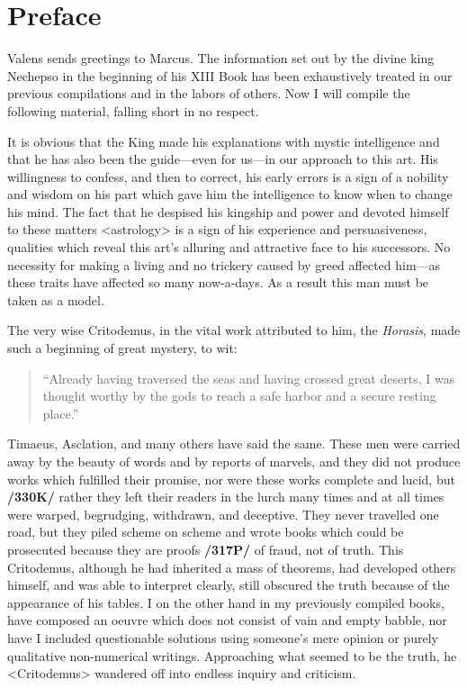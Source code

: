 \section{Preface}

 
Valens sends greetings to Marcus. The information set out by the divine king Nechepso in the beginning of his XIII Book has been exhaustively treated in our previous compilations and in the labors of others. Now I will compile the following material, falling short in no respect. 

It is obvious that the King made his explanations with mystic intelligence and that he has also been the guide—even for us—in our
approach to this art. His willingness to confess, and then to correct, his early errors is a sign of a nobility and wisdom on his part which gave him the intelligence to know when to change his mind. The fact that
he despised his kingship and power and devoted himself to these matters <astrology> is a sign of his experience and persuasiveness, qualities which reveal this art’s alluring and attractive face to his successors. No necessity for making a living and no trickery caused by greed affected him—as these traits have affected so many now-a-days. As a result this man must be taken as a model.

The very wise Critodemus, in the vital work attributed to him, the \textit{Horasis}, made such a beginning of great mystery, to wit: 
\begin{quote}
“Already having traversed the seas and having crossed great deserts, I was thought worthy by the gods to reach a safe harbor and a secure resting place.”
\end{quote}

 
Timaeus, Asclation, and many others have said the same. These men were carried away by the beauty of words and by reports of marvels, and they did not produce works which fulfilled their promise, nor were these works complete and lucid, but \textbf{/330K/} rather they left their readers in the lurch many times and at all times were warped, begrudging, withdrawn, and deceptive. They never travelled one road, but they piled scheme on scheme and wrote
books which could be prosecuted because they are proofs \textbf{/317P/} of fraud, not of truth. This  Critodemus, although he had inherited a mass of theorems, had developed others himself, and was able to interpret clearly, still obscured the truth because of the appearance of his tables. I on the other hand in my previously compiled books, have composed an oeuvre which does not consist of vain and empty babble, nor have I included questionable solutions using someone’s mere opinion or purely qualitative non-numerical writings. 
Approaching what seemed to be the truth, he <Critodemus> wandered off into endless inquiry and criticism. 

